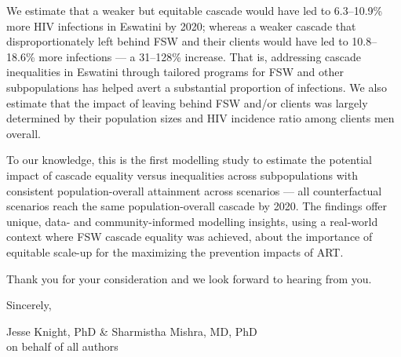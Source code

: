\par
We estimate that a weaker but equitable cascade
would have led to 6.3--10.9\% more HIV infections in Eswatini by 2020;
whereas a weaker cascade that disproportionately left behind FSW and their clients
would have led to 10.8--18.6\% more infections
--- a 31--128\% increase.
That is, addressing cascade inequalities in Eswatini
through tailored programs for FSW and other subpopulations
has helped avert a substantial proportion of infections.
We also estimate that the impact of
leaving behind FSW and/or clients was largely determined by
their population sizes and HIV incidence ratio among clients \vs men overall.
\par
To our knowledge, this is the first modelling study to estimate
the potential impact of cascade equality versus inequalities across subpopulations
with consistent population-overall attainment across scenarios ---
\ie all counterfactual scenarios reach the same population-overall cascade by 2020.
The findings offer unique, data- and community-informed modelling insights,
using a real-world context where FSW cascade equality was achieved,
about the importance of equitable scale-up
for the maximizing the prevention impacts of ART.
\par
Thank you for your consideration and we look forward to hearing from you.
\medskip\par
Sincerely,
\par
Jesse Knight, PhD \& Sharmistha Mishra, MD, PhD\\
on behalf of all authors
\restoregeometry%
